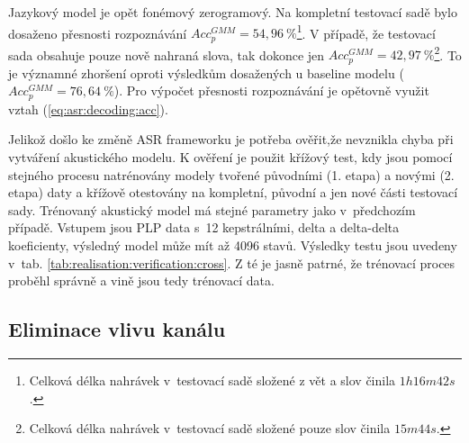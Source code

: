 Jazykový model je opět fonémový zerogramový.
Na kompletní testovací sadě bylo dosaženo přesnosti rozpoznávání $Acc_{p}^{GMM} = 54,96~\%$\footnote{Celková délka nahrávek v~testovací sadě složené z vět a slov činila $1h16m42s$.}.
V případě, že testovací sada obsahuje pouze nově nahraná slova, tak dokonce jen $Acc_{p}^{GMM} = 42,97~\%$\footnote{Celková délka nahrávek v~testovací sadě složené pouze slov činila $15m44s$.}.
To je významné zhoršení oproti výsledkům dosažených u baseline modelu ($Acc_{p}^{GMM} = 76,64~\%$).
Pro výpočet přesnosti rozpoznávání je opětovně využit vztah (\ref{eq:asr:decoding:acc}).

Jelikož došlo ke změně ASR frameworku je potřeba ověřit,že nevznikla chyba při vytváření akustického modelu.
K ověření je použit křížový test, kdy jsou pomocí stejného procesu natrénovány modely tvořené původními (1. etapa) a novými (2. etapa) daty a křížově otestovány na kompletní, původní a jen nové části testovací sady.
Trénovaný akustický model má stejné parametry jako v~předchozím případě.
Vstupem jsou PLP data s~12 kepstrálními, delta a delta-delta koeficienty, výsledný model může mít až 4096 stavů.
Výsledky testu jsou uvedeny v~tab. \ref{tab:realisation:verification:cross}.
Z té je jasně patrné, že trénovací proces proběhl správně a vině jsou tedy trénovací data.


\begin{table}[htpb]
  \centering
  \def\arraystretch{1.5}
  \caption[Křížový test s~CMN.]{Křížový test modelů natrénovaných a otestovaných na datech z 1. a 2. etapy.}
  \label{tab:realisation:verification:cross}
\end{table}


\subsection{Eliminace vlivu kanálu}
\label{chap:realisation:corpus:elimination}

